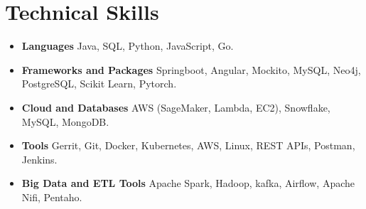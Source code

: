\documentclass[a4paper,3pt]{article}
\begin{document}
\section{Technical Skills}
\begin{itemize}[nosep,after=\strut, leftmargin=2em, itemsep=1pt]
\item \textbf{Languages}
\hspace*{18.5ex}                  Java, SQL, Python, JavaScript, Go.
\item \textbf{Frameworks and Packages}
 \hspace*{4ex} Springboot, Angular, Mockito, MySQL, Neo4j, PostgreSQL, Scikit Learn, Pytorch.
\item\textbf{Cloud and Databases}
 \hspace*{9.2ex} AWS (SageMaker, Lambda, EC2), Snowflake, MySQL, MongoDB.
 \item\textbf{Tools}
 \hspace*{23.8ex} Gerrit, Git, Docker, Kubernetes, AWS, Linux, REST APIs, Postman, Jenkins.
\item\textbf{Big Data and ETL Tools}
 \hspace*{7.3ex} Apache Spark, Hadoop, kafka, Airflow, Apache Nifi, Pentaho.
 \end{itemize}
\end{document}
